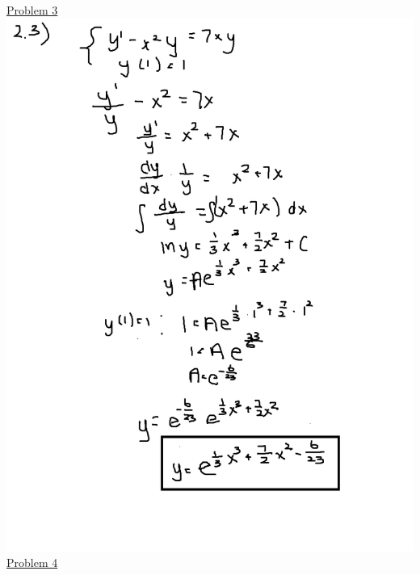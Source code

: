 \documentclass{article}
\begin{document}
\underline{Problem 3}\newline{}
\includegraphics[width=\textwidth,height=\textheight,keepaspectratio]{ams361q23.png}\clearpage{}
\underline{Problem 4}\newline{}
\end{document}
